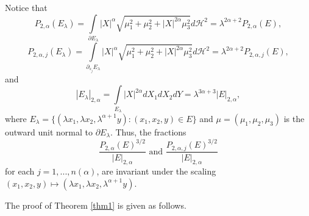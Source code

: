 \documentclass[10pt, reqno]{amsart}
\begin{document}
	Notice that
	$$P_{2,\alpha}(E_\lambda) = \int\limits_{\partial E_\lambda} |X|^\alpha\sqrt{\mu_1^2 +\mu_2^2 + |X|^{2\alpha} \mu_3^2}d\mathcal{H}^2 = \lambda^{2\alpha+2} P_{2,\alpha} (E), $$
	$$P_{2,\alpha,j}(E_\lambda) = \int\limits_{\partial_{s_j} E_\lambda} |X|^\alpha\sqrt{\mu_1^2 +\mu_2^2 + |X|^{2\alpha} \mu_3^2}d\mathcal{H}^2 = \lambda^{2\alpha+2} P_{2,\alpha,j} (E), $$
	and
	$$ |E_\lambda|_{2,\alpha} = \int\limits_{E_\lambda} |X|^{2\alpha} dX_1dX_2dY = \lambda^{3\alpha+3} |E|_{2,\alpha},$$
	where $E_\lambda = \{ (\lambda x_1, \lambda x_2, \lambda^{\alpha+1} y): (x_1, x_2, y) \in E \}$ and $\mu = (\mu_1, \mu_2, \mu_3)$ is the outward unit normal to $\partial E_\lambda$. Thus, the fractions
	$$\dfrac{P_{2,\alpha}(E)^{3/2}}{|E|_{2,\alpha}} \textrm{ and } \dfrac{P_{2,\alpha,j}(E)^{3/2}}{|E|_{2,\alpha}}$$ 
	for each $j=1,...,n(\alpha)$, are invariant under the scaling $(x_1,x_2,y) \mapsto (\lambda x_1, \lambda x_2, \lambda^{\alpha+1} y)$.
	
	The proof of Theorem \ref{thm1} is given as follows.
	
\end{document}
